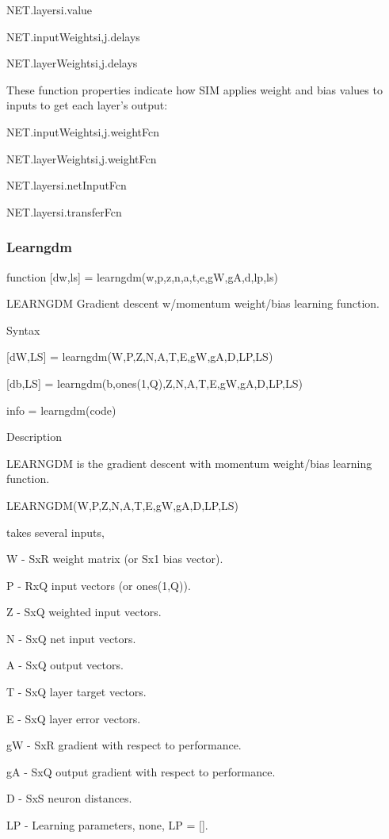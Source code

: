        NET.layers{i}.value

       NET.inputWeights{i,j}.delays

       NET.layerWeights{i,j}.delays

     These function properties indicate how SIM applies weight and
     bias values to inputs to get each layer's output:

       NET.inputWeights{i,j}.weightFcn

       NET.layerWeights{i,j}.weightFcn

       NET.layers{i}.netInputFcn

       NET.layers{i}.transferFcn

\subsubsection{Learngdm}
function [dw,ls] = learngdm(w,p,z,n,a,t,e,gW,gA,d,lp,ls)

LEARNGDM Gradient descent w/momentum weight/bias learning
function.

   Syntax

     [dW,LS] = learngdm(W,P,Z,N,A,T,E,gW,gA,D,LP,LS)

     [db,LS] = learngdm(b,ones(1,Q),Z,N,A,T,E,gW,gA,D,LP,LS)

     info = learngdm(code)

   Description

     LEARNGDM is the gradient descent with momentum weight/bias
     learning function.

     LEARNGDM(W,P,Z,N,A,T,E,gW,gA,D,LP,LS)

     takes several inputs,

       W  - SxR weight matrix (or Sx1 bias vector).

       P  - RxQ input vectors (or ones(1,Q)).

       Z  - SxQ weighted input vectors.

       N  - SxQ net input vectors.

       A  - SxQ output vectors.

       T  - SxQ layer target vectors.

       E  - SxQ layer error vectors.

       gW - SxR gradient with respect to performance.

       gA - SxQ output gradient with respect to performance.

       D  - SxS neuron distances.

       LP - Learning parameters, none, LP = [].

